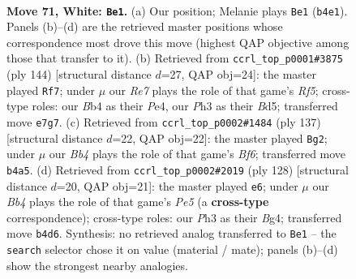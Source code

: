 \documentclass[11pt]{article}
\begin{document}
\clearpage

\begin{figure}[p]\centering
\begin{subfigure}{0.46\textwidth}\centering
\resizebox{\linewidth}{!}{%
\newchessgame
\chessboard[
  setfen={7k/3nR3/8/3r4/pB3P1p/P6P/4K3/8 w - - 5 71},
  showmover=false,
  pgfstyle=straightmove, color=movearrow, markmove={b4-e1}
]}
\caption{}
\end{subfigure}\hfill
\begin{subfigure}{0.46\textwidth}\centering
\resizebox{\linewidth}{!}{%
\newchessgame
\chessboard[
  setfen={4k3/8/1p2P3/3BpRbp/4P3/6r1/2K5/8 w - - 12 73},
  showmover=false,
  pgfstyle=straightmove, color=movearrow, markmove={f5-f7}
]}
\caption{}
\end{subfigure}
\\[4pt]
\begin{subfigure}{0.46\textwidth}\centering
\resizebox{\linewidth}{!}{%
\newchessgame
\chessboard[
  setfen={4k3/8/2r4p/R1N3p1/3K2P1/5b1P/8/8 b - - 0 69},
  showmover=false,
  pgfstyle=straightmove, color=movearrow, markmove={f3-g2}
]}
\caption{}
\end{subfigure}\hfill
\begin{subfigure}{0.46\textwidth}\centering
\resizebox{\linewidth}{!}{%
\newchessgame
\chessboard[
  setfen={1r1n4/3R4/6k1/p1p1P3/2P3B1/1P4P1/6K1/8 w - - 3 65},
  showmover=false,
  pgfstyle=straightmove, color=movearrow, markmove={e5-e6}
]}
\caption{}
\end{subfigure}
\caption{\textbf{Move 71, White: \texttt{Be1}.} (a) Our position; Melanie plays \texttt{Be1} (\texttt{b4e1}). Panels (b)--(d) are the retrieved master positions whose correspondence most drove this move (highest QAP objective among those that transfer to it). (b) Retrieved from \texttt{ccrl\_top\_p0001\#3875} (ply 144) [structural distance $d$=27, QAP obj=24]: the master played \texttt{Rf7}; under $\mu$ our \emph{Re7} plays the role of that game's \emph{Rf5}; cross-type roles: our \emph{B}b4 as their \emph{P}e4, our \emph{P}h3 as their \emph{B}d5; transferred move \texttt{e7g7}. (c) Retrieved from \texttt{ccrl\_top\_p0002\#1484} (ply 137) [structural distance $d$=22, QAP obj=22]: the master played \texttt{Bg2}; under $\mu$ our \emph{Bb4} plays the role of that game's \emph{Bf6}; transferred move \texttt{b4a5}. (d) Retrieved from \texttt{ccrl\_top\_p0002\#2019} (ply 128) [structural distance $d$=20, QAP obj=21]: the master played \texttt{e6}; under $\mu$ our \emph{Bb4} plays the role of that game's \emph{Pe5} (a \textbf{cross-type} correspondence); cross-type roles: our \emph{P}h3 as their \emph{B}g4; transferred move \texttt{b4d6}. Synthesis: no retrieved analog transferred to \texttt{Be1} -- the \texttt{search} selector chose it on value (material / mate); panels (b)--(d) show the strongest nearby analogies.}
\label{fig:thought-m140}
\end{figure}
\end{document}
